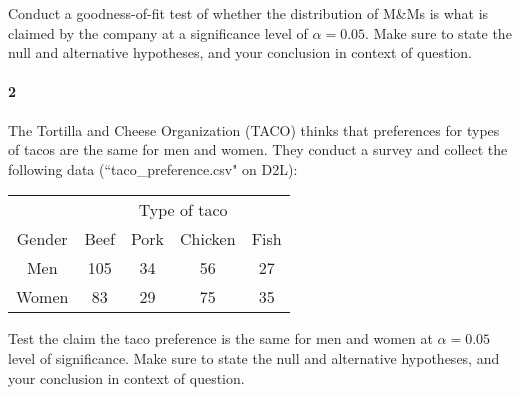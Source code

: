 \documentclass{article}
\begin{document}
\begin{flushleft}
\begin{enumalpha}
\item Conduct a goodness-of-fit test of whether the distribution of M\&Ms is what is claimed by the company at a significance level of $\alpha=0.05$. Make sure to state the null and alternative hypotheses, and your conclusion in context of question.

\end{enumalpha}



\newpage
\paragraph{2} The Tortilla and Cheese Organization (TACO) thinks that preferences for types of tacos are the same for men and women. They conduct a survey and collect the following data (``taco\_preference.csv" on D2L):\\
\medskip
{\centering
\begin{tabular}{c | c  c c c}
\multicolumn{1}{c}{} & \multicolumn{4}{c}{\large Type of taco}\\
Gender & Beef & Pork & Chicken & Fish\\
\hline
Men & 105 & 34 & 56 & 27\\
Women & 83 & 29 & 75 & 35 \\
\end{tabular}
\par}
\bigskip
Test the claim the taco preference is the same for men and women at $\alpha = 0.05$ level of significance. Make sure to state the null and alternative hypotheses, and your conclusion in context of question.

\vspace{3.25in}



\end{flushleft}
\end{document}
